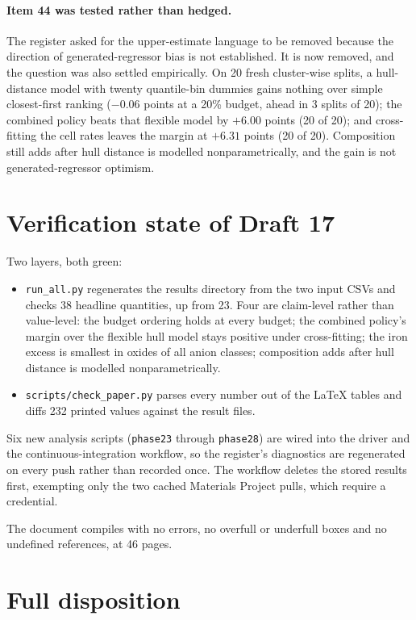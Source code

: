 \documentclass[11pt]{article}
\begin{document}
\paragraph{Item 44 was tested rather than hedged.} The register asked for the upper-estimate
language to be removed because the direction of generated-regressor bias is not established.
It is now removed, and the question was also settled empirically. On 20 fresh cluster-wise
splits, a hull-distance model with twenty quantile-bin dummies gains nothing over simple
closest-first ranking ($-0.06$ points at a 20\% budget, ahead in 3 splits of 20); the
combined policy beats that flexible model by $+6.00$ points (20 of 20); and cross-fitting
the cell rates leaves the margin at $+6.31$ points (20 of 20). Composition still adds after
hull distance is modelled nonparametrically, and the gain is not generated-regressor
optimism.

\section{Verification state of Draft 17}

Two layers, both green:

\begin{itemize}
\item \texttt{run\_all.py} regenerates the results directory from the two input CSVs and
checks 38 headline quantities, up from 23. Four are claim-level rather than value-level: the
budget ordering holds at every budget; the combined policy's margin over the flexible hull
model stays positive under cross-fitting; the iron excess is smallest in oxides of all anion
classes; composition adds after hull distance is modelled nonparametrically.
\item \texttt{scripts/check\_paper.py} parses every number out of the \LaTeX{} tables and
diffs 232 printed values against the result files.
\end{itemize}

Six new analysis scripts (\texttt{phase23} through \texttt{phase28}) are wired into the
driver and the continuous-integration workflow, so the register's diagnostics are regenerated
on every push rather than recorded once. The workflow deletes the stored results first,
exempting only the two cached Materials Project pulls, which require a credential.

The document compiles with no errors, no overfull or underfull boxes and no undefined
references, at 46 pages.

\section{Full disposition}
\end{document}
